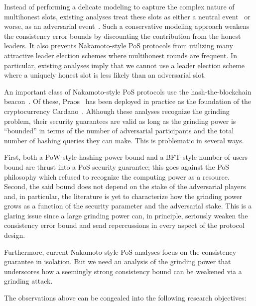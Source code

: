 Instead of performing a delicate modeling 
to capture the complex nature of multihonest slots, 
existing analyses treat these slots as either a neutral event~\cite{SnowWhite,Sleepy} 
or worse, as an adversarial event~\cite{Ouroboros,Praos,Genesis}. 
Such a conservative modeling approach weakens the consistency error bounds 
by discounting the contribution from the honest leaders. 
It also prevents Nakamoto-style PoS protocols from 
utilizing many attractive leader election schemes 
where multihonest rounds are frequent. 
In particular, existing analyses imply 
that we cannot use a leader election scheme 
where a uniquely honest slot is less likely than an adversarial slot.



An important class of Nakamoto-style PoS protocols use the hash-the-blockchain beacon~\cite{SnowWhite,Sleepy,Praos,Genesis}.
Of these, Praos~\cite{Praos} has been deployed in practice 
as the foundation of the cryptocurrency Cardano~\cite{Cardano}. 
Although these analyses recognize the grinding problem, 
their security guarantees are valid as long as the grinding power is ``bounded'' 
in terms of the number of adversarial participants and 
the total number of hashing queries they can make. 
This is problematic in several ways.

First, both a PoW-style hashing-power bound 
and a BFT-style number-of-users bound are thrust into 
a PoS security guarantee; 
this goes against the PoS philosophy which 
refused to recognize the computing power as a resource. 
Second, 
the said bound does not depend on the stake of the adversarial players 
and, in particular, 
the literature is yet to characterize how the grinding power grows as a function 
of the security parameter and the adversarial stake. 
This is a glaring issue since 
a large grinding power can, in principle, seriously weaken the consistency error bound and 
send repercussions in every aspect of the protocol design. 


Furthermore, 
current Nakamoto-style PoS analyses focus on the consistency guarantee in isolation. 
But we need an analysis of the grinding power that underscores 
how a seemingly strong consistency bound 
can be weakened via a grinding attack. 




The observations above can be congealed into the following research objectives:


